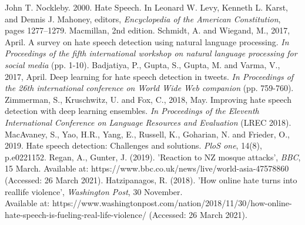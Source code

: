 \documentclass[conference]{IEEEtran}
\begin{document}
\begin{thebibliography}{00}
 John T. Nockleby. 2000. Hate Speech. In Leonard W.
Levy, Kenneth L. Karst, and Dennis J. Mahoney,
editors, \textit{Encyclopedia of the American Constitution},
pages 1277–1279. Macmillan, 2nd edition.
 Schmidt, A. and Wiegand, M., 2017, April. A survey on hate speech detection using natural language processing. \textit{In Proceedings of the fifth international workshop on natural language processing for social media} (pp. 1-10).
 Badjatiya, P., Gupta, S., Gupta, M. and Varma, V., 2017, April. Deep learning for hate speech detection in tweets. \textit{In Proceedings of the 26th international conference on World Wide Web companion} (pp. 759-760).
 Zimmerman, S., Kruschwitz, U. and Fox, C., 2018, May. Improving hate speech detection with deep learning ensembles. \textit{In Proceedings of the Eleventh International Conference on Language Resources and Evaluation} (LREC 2018).
 MacAvaney, S., Yao, H.R., Yang, E., Russell, K., Goharian, N. and Frieder, O., 2019. Hate speech detection: Challenges and solutions. \textit{PloS one}, 14(8), p.e0221152.
 Regan, A., Gunter, J. (2019). 'Reaction to NZ mosque attacks', \textit{BBC}, 15 March. Available at: https://www.bbc.co.uk/news/live/world-asia-47578860 (Accessed: 26 March 2021).
 Hatzipanagos, R. (2018). 'How online hate turns into reallife violence', \textit{Washington Post}, 30 November. \\ Available at: https://www.washingtonpost.com/nation/2018/11/30/how-online-hate-speech-is-fueling-real-life-violence/ (Accessed: 26 March 2021).
\end{thebibliography}
\vspace{12pt}
\end{document}
